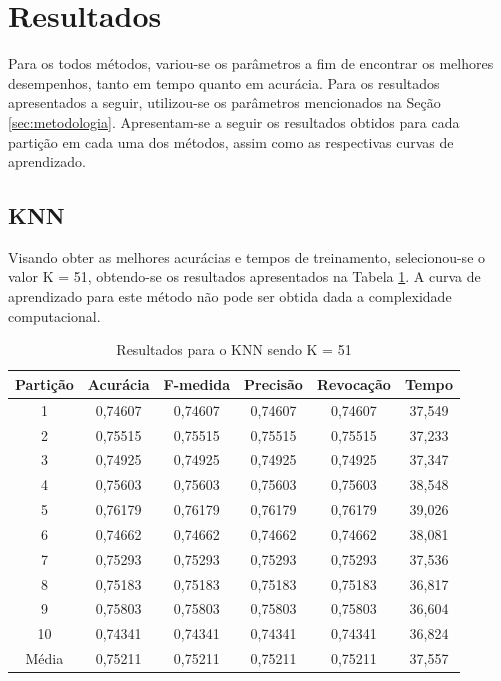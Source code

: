 \section{Resultados}

Para os todos métodos, variou-se os parâmetros a fim de encontrar os melhores desempenhos, tanto em tempo quanto em acurácia. Para os resultados apresentados a seguir, utilizou-se os parâmetros mencionados na Seção \ref{sec:metodologia}. Apresentam-se a seguir os resultados obtidos para cada partição em cada uma dos métodos, assim como as respectivas curvas de aprendizado.

\subsection{KNN}

Visando obter as melhores acurácias e tempos de treinamento, selecionou-se o valor K = 51, obtendo-se os resultados apresentados na Tabela \ref{table:resultadosKNN}. A curva de aprendizado para este método não pode ser obtida dada a complexidade computacional.

\begin{table}[h]
\centering
\caption{Resultados para o KNN sendo K = 51}
\vspace{0.2cm}
\begin{tabular}{c|c|c|c|c|c}
Partição & Acurácia & F-medida & Precisão & Revocação & Tempo \\
\hline
1  & 0,74607 & 0,74607 & 0,74607 & 0,74607 & 37,549 \\
2  & 0,75515 & 0,75515 & 0,75515 & 0,75515 & 37,233 \\
3  & 0,74925 & 0,74925 & 0,74925 & 0,74925 & 37,347 \\
4  & 0,75603 & 0,75603 & 0,75603 & 0,75603 & 38,548 \\
5  & 0,76179 & 0,76179 & 0,76179 & 0,76179 & 39,026 \\
6  & 0,74662 & 0,74662 & 0,74662 & 0,74662 & 38,081 \\
7  & 0,75293 & 0,75293 & 0,75293 & 0,75293 & 37,536 \\
8  & 0,75183 & 0,75183 & 0,75183 & 0,75183 & 36,817 \\
9  & 0,75803 & 0,75803 & 0,75803 & 0,75803 & 36,604 \\
10 & 0,74341 & 0,74341 & 0,74341 & 0,74341 & 36,824 \\
\hline
Média & 0,75211 & 0,75211 & 0,75211 & 0,75211 & 37,557

\end{tabular} 
\label{table:resultadosKNN}
\end{table}

